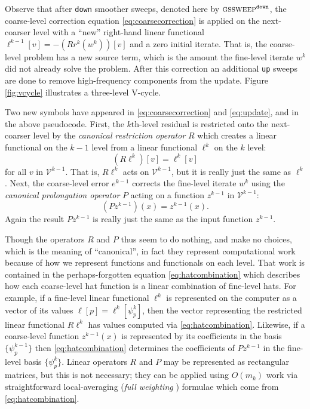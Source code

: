 \documentclass[letterpaper,final,12pt,reqno]{amsart}
\numberwithin{equation}{section}
\numberwithin{figure}{section}
\numberwithin{table}{section}
\begin{document}
Observe that after \texttt{down} smoother sweeps, denoted here by $\text{\textsc{gssweep}}^{\text{\texttt{down}}}$, the coarse-level correction equation \eqref{eq:coarsecorrection} is applied on the next-coarser level with a ``new'' right-hand linear functional $\ell^{k-1}[v]=-(R r^k(w^k))[v]$ and a zero initial iterate.  That is, the coarse-level problem has a new source term, which is the amount the fine-level iterate $w^k$ did not already solve the problem.  After this correction an additional \texttt{up} sweeps are done to remove high-frequency components from the update.  Figure \ref{fig:vcycle} illustrates a three-level V-cycle.

Two new symbols have appeared in \eqref{eq:coarsecorrection} and \eqref{eq:update}, and in the above pseudocode.  First, the $k$th-level residual is restricted onto the next-coarser level by the \emph{canonical restriction operator} $R$ which creates a linear functional on the $k-1$ level from a linear functional $\ell^k$ on the $k$ level:
\begin{equation}
  (R \ell^k)[v] = \ell^k[v] \label{eq:canonicalrestriction}
\end{equation}
for all $v$ in $\mathcal{V}^{k-1}$.  That is, $R \ell^k$ acts on $\mathcal{V}^{k-1}$, but it is really just the same as $\ell^k$.  Next, the coarse-level error $e^{k-1}$ corrects the fine-level iterate $w^k$ using the \emph{canonical prolongation operator} $P$ acting on a function $z^{k-1}$ in $\mathcal{V}^{k-1}$:
\begin{equation}
  (P z^{k-1})(x) = z^{k-1}(x). \label{eq:canonicalprolongation}
\end{equation}
Again the result $P z^{k-1}$ is really just the same as the input function $z^{k-1}$.

Though the operators $R$ and $P$ thus seem to do nothing, and make no choices, which is the meaning of ``canonical'', in fact they represent computational work because of how we represent functions and functionals on each level.  That work is contained in the perhaps-forgotten equation \eqref{eq:hatcombination} which describes how each coarse-level hat function is a linear combination of fine-level hats.  For example, if a fine-level linear functional $\ell^k$ is represented on the computer as a vector of its values $\ell[p] = \ell^k[\psi_p^k]$, then the vector representing the restricted linear functional $R \ell^k$ has values computed via \eqref{eq:hatcombination}.  Likewise, if a coarse-level function $z^{k-1}(x)$ is represented by its coefficients in the basis $\{\psi_p^{k-1}\}$ then \eqref{eq:hatcombination} determines the coefficients of $P z^{k-1}$ in the fine-level basis $\{\psi_p^k\}$.  Linear operators $R$ and $P$ may be represented as rectangular matrices, but this is not necessary; they can be applied using $O(m_k)$ work via straightforward local-averaging (\emph{full weighting} \cite{Briggsetal2000}) formulae which come from \eqref{eq:hatcombination}.
\end{document}
